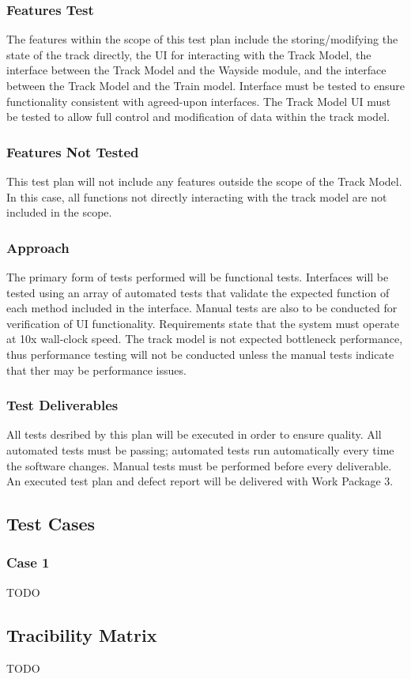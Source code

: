 \documentclass{scrreprt}
\begin{document}
\subsubsection{Features Test}
The features within the scope of this test plan include the storing/modifying the state of the track directly, the UI for interacting with the Track Model, the interface between the Track Model and the Wayside module, and the interface between the Track Model and the Train model. Interface must be tested to ensure functionality consistent with agreed-upon interfaces. The Track Model UI must be tested to allow full control and modification of data within the track model.

\subsubsection{Features Not Tested}
This test plan will not include any features outside the scope of the Track Model. In this case, all functions not directly interacting with the track model are not included in the scope.

\subsubsection{Approach}
The primary form of tests performed will be functional tests. Interfaces will be tested using an array of automated tests that validate the expected function of each method included in the interface. Manual tests are also to be conducted for verification of UI functionality. Requirements state that the system must operate at 10x wall-clock speed. The track model is not expected bottleneck performance, thus performance testing will not be conducted unless the manual tests indicate that ther may be performance issues.

\subsubsection{Test Deliverables}
All tests desribed by this plan will be executed in order to ensure quality. All automated tests must be passing; automated tests run automatically every time the software changes. Manual tests must be performed before every deliverable. An executed test plan and defect report will be delivered with Work Package 3.

\subsection{Test Cases}

\subsubsection{Case 1}

TODO

\subsection{Tracibility Matrix}

TODO
\end{document}
